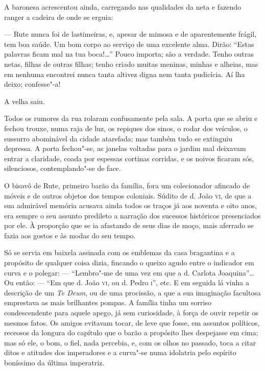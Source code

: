 A baronesa acrescentou ainda, carregando nas qualidades da neta e
fazendo ranger a cadeira de onde se erguia:

--- Rute nunca foi de lastimeiras, e, apesar de mimosa e de aparentemente
frágil, tem boa saúde. Um bom corpo ao serviço de uma excelente alma.
Dirão: ``Estas palavras ficam mal na tua boca!\ldots{}'' Pouco importa; são a
verdade. Tenho outras netas, filhas de outras filhas; tenho criado
muitas meninas, minhas e alheias, mas em nenhuma encontrei nunca tanta
altivez digna nem tanta pudicícia. Aí lha deixo; confesse"-a!

A velha saiu.

Todos os rumores da rua rolaram confusamente pela sala. A porta que se
abriu e fechou trouxe, numa raja de luz, os repiques dos sinos, o rodar
dos veículos, o sussurro abominável da cidade atarefada; mas também tudo
se extinguiu depressa. A porta fechou"-se, as janelas voltadas para o
jardim mal deixavam entrar a claridade, coada por espessas cortinas
corridas, e os noivos ficaram sós, silenciosos, contemplando"-se de face.

\asterisc

O bisavô de Rute, primeiro barão da família, fora um colecionador
afincado de móveis e de outros objetos dos tempos coloniais. Súdito de
d. João \textsc{vi}, de que a sua admirável memória acusava ainda todos os traços
já aos noventa e oito anos, era sempre o seu assunto predileto a
narração dos sucessos históricos presenciados por ele. À proporção que
se ia afastando de seus dias de moço, mais aferrado se fazia aos gostos
e às modas do seu tempo.

Só se servia em baixela assinada com os emblemas da casa bragantina e a
propósito de qualquer coisa dizia, fincando o queixo agudo entre o
indicador em curva e o polegar: --- ``Lembro"-me de uma vez em que a d.
Carlota Joaquina''\ldots{} Ou então: --- ``Em que d. João \textsc{vi}, ou d. Pedro \textsc{i}'',
etc. E em seguida lá vinha a descrição de um \emph{Te Deum}, ou de uma
procissão, a que a sua imaginação facultosa emprestava as mais
brilhantes pompas. A família tinha um sorriso condescendente para aquele
apego, já sem curiosidade, à força de ouvir repetir os mesmos fatos. Os
amigos evitavam tocar, de leve que fosse, em assuntos políticos,
receosos da longura do capítulo que o barão a propósito lhes despejasse
em cima; mas só ele, o bom, o fiel, nada percebia, e, com os olhos no
passado, toca a citar ditos e atitudes dos imperadores e a curva"-se
numa idolatria pelo espírito boníssimo da última imperatriz.

